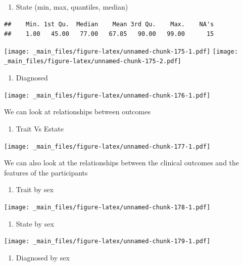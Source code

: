 \documentclass[
]{book}
\providecommand{\tightlist}{%
  \setlength{\itemsep}{0pt}\setlength{\parskip}{0pt}}
\begin{document}
\begin{enumerate}
\def\labelenumi{\alph{enumi}.}
\setcounter{enumi}{1}
\tightlist
\item
  State (min, max, quantiles, median)
\end{enumerate}

\begin{verbatim}
##    Min. 1st Qu.  Median    Mean 3rd Qu.    Max.    NA's 
##    1.00   45.00   77.00   67.85   90.00   99.00      15
\end{verbatim}

\texttt{[image: \_main\_files/figure-latex/unnamed-chunk-175-1.pdf]} \texttt{[image: \_main\_files/figure-latex/unnamed-chunk-175-2.pdf]}

\begin{enumerate}
\def\labelenumi{\alph{enumi}.}
\setcounter{enumi}{2}
\tightlist
\item
  Diagnosed
\end{enumerate}

\texttt{[image: \_main\_files/figure-latex/unnamed-chunk-176-1.pdf]}

We can look at relationships between outcomes

\begin{enumerate}
\def\labelenumi{\alph{enumi}.}
\setcounter{enumi}{3}
\tightlist
\item
  Trait Vs Estate
\end{enumerate}

\texttt{[image: \_main\_files/figure-latex/unnamed-chunk-177-1.pdf]}

We can also look at the relationships between the clinical outcomes and the features of the participants

\begin{enumerate}
\def\labelenumi{\alph{enumi}.}
\setcounter{enumi}{4}
\tightlist
\item
  Trait by sex
\end{enumerate}

\texttt{[image: \_main\_files/figure-latex/unnamed-chunk-178-1.pdf]}

\begin{enumerate}
\def\labelenumi{\alph{enumi}.}
\setcounter{enumi}{5}
\tightlist
\item
  State by sex
\end{enumerate}

\texttt{[image: \_main\_files/figure-latex/unnamed-chunk-179-1.pdf]}

\begin{enumerate}
\def\labelenumi{\alph{enumi}.}
\setcounter{enumi}{6}
\tightlist
\item
  Diagnosed by sex
\end{enumerate}
\end{document}
